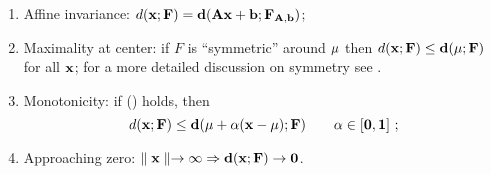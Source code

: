 \documentclass[a4paper,12pt]{article}
\begin{document}
\begin{enumerate}[label=\textbf{P\arabic*}]
\item  Affine invariance: $d(\bf{x}; F)=d(\bf{A} \bf{x}+ \bf{b}; F_{\bf{A},\bf{b}})$;
\item  Maximality at center: if $F$ is ``symmetric'' around $\bf{\mu}$ then $d(\bf{x}; F) \leq d(\bf{\mu}; F)$ for all $\bf{x}$; for a more detailed discussion on symmetry see \citet{Serfling2006}. 
\item  Monotonicity: if () holds, then 
\begin{equation*}
d(\bf{x}; F) \le d(\bf{\mu} + \alpha (\bf{x} - \bf{\mu}); F) \qquad \alpha \in [0,1] \ ;
\end{equation*}
\item  Approaching zero: $\parallel \bf{x} \parallel \rightarrow \infty \Rightarrow d(\bf{x}; F) \rightarrow 0$.
\end{enumerate}
\end{document}
